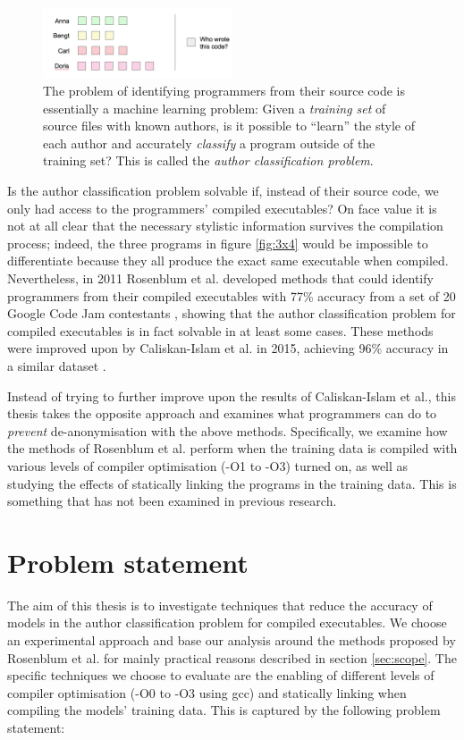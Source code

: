 \documentclass[a4paper,11pt]{kth-mag}
\begin{document}
\begin{figure}[!htb]
    \centering
    \includegraphics[width=0.5\textwidth]{id-ml}
    \caption{The problem of identifying programmers from their source code is
    essentially a machine learning problem: Given a \emph{training set} of
    source files with known authors, is it possible to ``learn'' the style of
    each author and accurately \emph{classify} a program outside of the
    training set? This is called the \emph{author classification problem}. }
    \label{fig:id-ml}
\end{figure}

Is the author classification problem solvable if, instead of their source code,
we only had access to the programmers' compiled executables? On face value it
is not at all clear that the necessary stylistic information survives the
compilation process; indeed, the three programs in figure \ref{fig:3x4} would
be impossible to differentiate because they all produce the exact same
executable when compiled. Nevertheless, in 2011 Rosenblum et al. developed
methods that could identify programmers from their compiled executables 
with 77\% accuracy from a set of 20 Google Code Jam contestants
\parencite{rosenblum2011wrote}, showing that the author classification problem
for compiled executables is in fact solvable in at least some cases. These
methods were improved upon by Caliskan-Islam et al. in 2015, achieving 96\%
accuracy in a similar dataset \parencite{caliskan2015coding}. 

Instead of trying to further improve upon the results of Caliskan-Islam et al.,
this thesis takes the opposite approach and examines what programmers can do to
\emph{prevent} de-anonymisation with the above methods. Specifically, we
examine how the methods of Rosenblum et al. \parencite{rosenblum2011wrote}
perform when the training data is compiled with various levels of compiler
optimisation (-O1 to -O3) turned on, as well as studying the effects of
statically linking the programs in the training data. This is something that
has not been examined in previous research.

\section{Problem statement}
The aim of this thesis is to investigate techniques that reduce the accuracy of
models in the author classification problem for compiled executables. We choose
an experimental approach and base our analysis around the methods proposed by
Rosenblum et al. \parencite{rosenblum2011wrote} for mainly practical reasons
described in section \ref{sec:scope}. The specific techniques we choose to
evaluate are the enabling of different levels of compiler optimisation (-O0 to
-O3 using gcc) and statically linking when compiling the models' training
data. This is captured by the following problem statement: 
\end{document}
